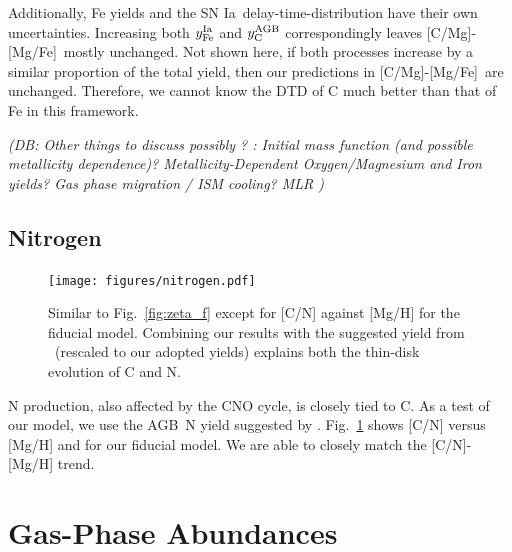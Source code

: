 \documentclass[fleqn,
usenatbib]{mnras}
\newcommand{\JJ}{\citetalias{james+21}}
\newcommand{\agb}{AGB}
\newcommand{\ia}{SN Ia}
\newcommand{\caafe}{[C/Mg]-[Mg/Fe]}
\newcommand{\Ycagb}{{y_{\rm C}^{\rm AGB}}}
\newcommand{\dbnote}[1]{ {\color{Thistle} \textit{\small (DB: #1)}} }
\begin{document}
Additionally, Fe yields and the \ia\  delay-time-distribution have their own uncertainties. Increasing both $y_{\rm Fe}^{\rm Ia}$ and $\Ycagb$ correspondingly leaves \caafe\ mostly unchanged. Not shown here, if both processes increase by a similar proportion of the total yield, then our predictions in \caafe\ are unchanged. Therefore, we cannot know the DTD of C much better than that of Fe in this framework.


\dbnote{Other things to discuss possibly ? :
 Initial mass function (and possible metallicity dependence)? Metallicity-Dependent Oxygen/Magnesium and Iron yields? Gas phase migration / ISM cooling?  MLR
 }


\subsection{Nitrogen}


\begin{figure}
\centering
\texttt{[image: figures/nitrogen.pdf]}

\caption[]{Similar to Fig.~\ref{fig:zeta_f} except for [C/N] against [Mg/H] for the fiducial model. Combining our results with the suggested yield from \JJ\ (rescaled to our adopted yields) explains both the thin-disk evolution of C and N. 
}
\label{fig:nitrogen}
\end{figure}

N production, also affected by the CNO cycle, is closely tied to C. As a test of our model, we use the \agb\ N yield suggested by \citet{james+23}. Fig.~\ref{fig:nitrogen} shows [C/N] versus [Mg/H] and for our fiducial model. We are able to closely match the [C/N]-[Mg/H] trend. 




\section{Gas-Phase Abundances}\label{sec:gas}
\end{document}
